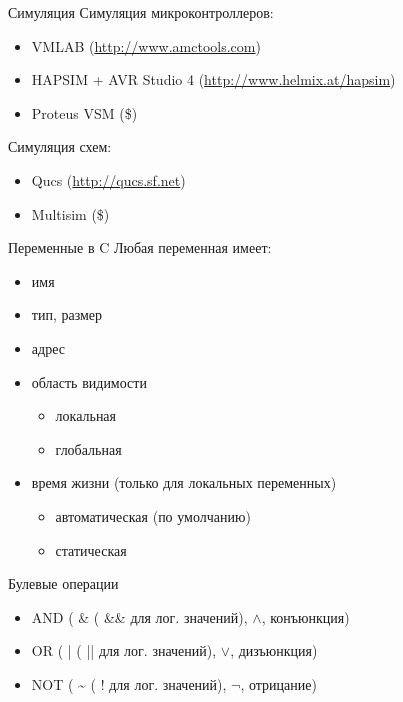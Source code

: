 \documentclass[t]{beamer}
\renewcommand{\emph}[1]{{\color{blue} #1}}
\begin{document}
\begin{frame}{Симуляция}
\Large
Симуляция микроконтроллеров:

  \begin{itemize}
  \item VMLAB (\url{http://www.amctools.com})
  \item HAPSIM + AVR Studio 4 (\url{http://www.helmix.at/hapsim})
  \item Proteus VSM (\$)
  \end{itemize}

Симуляция схем:

  \begin{itemize}
  \item Qucs (\url{http://qucs.sf.net})
  \item Multisim (\$)
  \end{itemize}
\end{frame}

\begin{frame}{Переменные в C}
  Любая переменная имеет:
  \begin{itemize}
  \item имя
  \item тип, размер
  \item адрес
  \item область видимости
    \begin{itemize}
    \item локальная
    \item глобальная
    \end{itemize}
  \item время жизни (только для локальных переменных)
    \begin{itemize}
    \item автоматическая (по умолчанию)
    \item статическая
    \end{itemize}
  \end{itemize}
\end{frame}

\begin{frame}{Булевые операции}
\Large
  \begin{itemize}
  \item \emph{AND} (\emph{\&} (\emph{\&\&} для лог. значений),
    \emph{$\land$}, конъюнкция)
  \item \emph{OR} (\emph{|} (\emph{||} для лог. значений),
    \emph{$\lor$}, дизъюнкция)
  \item \emph{NOT} (\emph{\~{}} (\emph{!} для лог. значений), \emph{$\lnot$}, отрицание)
  \end{itemize}
\end{frame}
\end{document}
